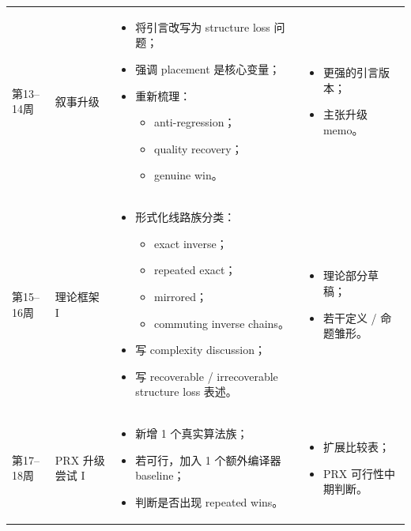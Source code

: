\documentclass[11pt]{article}
\begin{document}
\begin{longtable}{p{} p{} p{} p{}}
第13--14周 &
叙事升级 &
\begin{itemize}
    \item 将引言改写为 structure loss 问题；
    \item 强调 placement 是核心变量；
    \item 重新梳理：
    \begin{itemize}
        \item anti-regression；
        \item quality recovery；
        \item genuine win。
    \end{itemize}
\end{itemize}
&
\begin{itemize}
    \item 更强的引言版本；
    \item 主张升级 memo。
\end{itemize}
\\

第15--16周 &
理论框架 I &
\begin{itemize}
    \item 形式化线路族分类：
    \begin{itemize}
        \item exact inverse；
        \item repeated exact；
        \item mirrored；
        \item commuting inverse chains。
    \end{itemize}
    \item 写 complexity discussion；
    \item 写 recoverable / irrecoverable structure loss 表述。
\end{itemize}
&
\begin{itemize}
    \item 理论部分草稿；
    \item 若干定义 / 命题雏形。
\end{itemize}
\\

第17--18周 &
PRX 升级尝试 I &
\begin{itemize}
    \item 新增 1 个真实算法族；
    \item 若可行，加入 1 个额外编译器 baseline；
    \item 判断是否出现 repeated wins。
\end{itemize}
&
\begin{itemize}
    \item 扩展比较表；
    \item PRX 可行性中期判断。
\end{itemize}
\\


\end{longtable}
\end{document}
